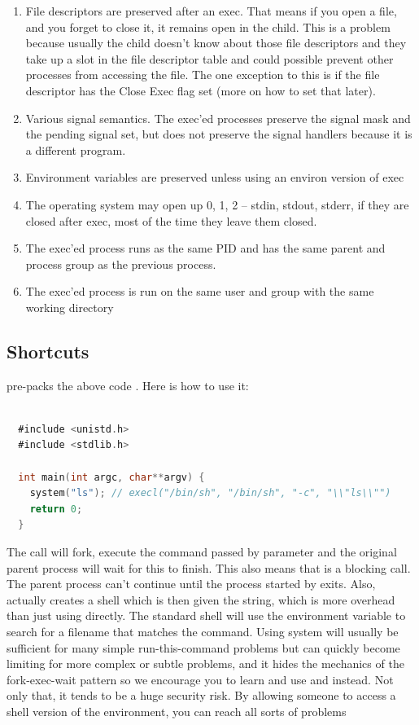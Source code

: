 \begin{enumerate}
\item File descriptors are preserved after an exec. That means if you open a file, and you forget to close it, it remains open in the child.
  This is a problem because usually the child doesn't know about those file descriptors and they take up a slot in the file descriptor table and could possible prevent other processes from accessing the file.
  The one exception to this is if the file descriptor has the Close Exec flag set (more on how to set that later).
\item Various signal semantics. The exec'ed processes preserve the signal mask and the pending signal set, but does not preserve the signal handlers because it is a different program.
\item Environment variables are preserved unless using an environ version of exec
  \item The operating system may open up 0, 1, 2 -- stdin, stdout, stderr, if they are closed after exec, most of the time they leave them closed.
  \item The exec'ed process runs as the same PID and has the same parent and process group as the previous process.
    \item The exec'ed process is run on the same user and group with the same working directory
\end{enumerate}

\subsection{Shortcuts}

 pre-packs the above code \cite[P. 371]{jones2010wg14}. Here is how to use it:

\begin{lstlisting}[language=C]

  #include <unistd.h>
  #include <stdlib.h>

  int main(int argc, char**argv) {
    system("ls"); // execl("/bin/sh", "/bin/sh", "-c", "\\"ls\\"")
    return 0;
  }
\end{lstlisting}

The  call will fork, execute the command passed by parameter and the original parent process will wait for this to finish.
This also means that  is a blocking call.
The parent process can't continue until the process started by  exits.
Also,  actually creates a shell which is then given the string, which is more overhead than just using  directly.
The standard shell will use the  environment variable to search for a filename that matches the command.
Using system will usually be sufficient for many simple run-this-command problems but can quickly become limiting for more complex or subtle problems, and it hides the mechanics of the fork-exec-wait pattern so we encourage you to learn and use   and  instead.
Not only that, it tends to be a huge security risk.
By allowing someone to access a shell version of the environment, you can reach all sorts of problems

